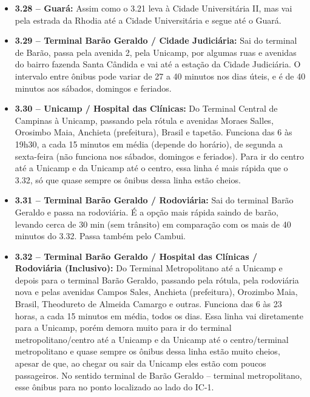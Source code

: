 \begin{itemize}
    \item  \textbf{3.28 -- Guará:} Assim como o 3.21 leva à Cidade Universitária
        II, mas vai pela estrada da Rhodia até a Cidade Universitária e segue
        até o Guará.

    \item  \textbf{3.29 -- Terminal Barão Geraldo / Cidade Judiciária:} Sai do
        terminal de Barão, passa pela avenida 2, pela Unicamp, por algumas ruas
        e avenidas do bairro fazenda Santa Cândida e vai até a estação da Cidade
        Judiciária. O intervalo entre ônibus pode variar de 27 a 40 minutos nos
        dias úteis, e é de 40 minutos aos sábados, domingos e feriados.

    \item  \textbf{3.30 -- Unicamp / Hospital das Clínicas:} Do Terminal Central
        de Campinas à Unicamp, passando pela rótula e avenidas Moraes Salles,
        Orosimbo Maia, Anchieta (prefeitura), Brasil e tapetão. Funciona das 6
        às 19h30, a cada 15 minutos em média (depende do horário), de segunda a
        sexta-feira (não funciona nos sábados, domingos e feriados). Para ir do
        centro até a Unicamp e da Unicamp até o centro, essa linha é mais rápida
        que o 3.32, só que quase sempre os ônibus dessa linha estão cheios.

    \item  \textbf{3.31 -- Terminal Barão Geraldo / Rodoviária:} Sai do terminal
        Barão Geraldo e passa na rodoviária. É a opção mais rápida saindo de
        barão, levando cerca de 30 min (sem trânsito) em comparação com os mais
        de 40 minutos do 3.32. Passa também pelo Cambui.

    \item  \textbf{3.32 -- Terminal Barão Geraldo / Hospital das Clínicas /
        Rodoviária (Inclusivo):} Do Terminal Metropolitano até a Unicamp e
        depois para o terminal Barão Geraldo, passando pela rótula, pela
        rodoviária nova e pelas avenidas Campos Sales, Anchieta (prefeitura),
        Orozimbo Maia, Brasil, Theodureto de Almeida Camargo e outras. Funciona
        das 6 às 23 horas, a cada 15 minutos em média, todos os dias. Essa linha
        vai diretamente para a Unicamp, porém demora muito para ir do terminal
        metropolitano/centro até a Unicamp e da Unicamp até o centro/terminal
        metropolitano e quase sempre os ônibus dessa linha estão muito cheios,
        apesar de que, ao chegar ou sair da Unicamp eles estão com poucos
        passageiros. No sentido terminal de Barão Geraldo -- terminal
        metropolitano, esse ônibus para no ponto localizado ao lado do IC-1.


\end{itemize}
